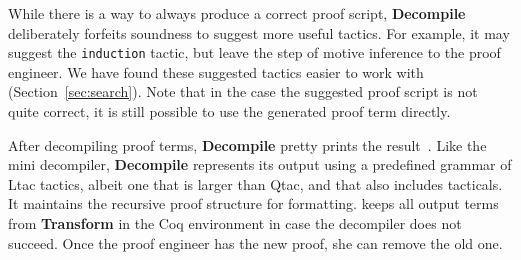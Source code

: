 While there is a way to always produce a correct proof script,
\textbf{Decompile} deliberately forfeits soundness to suggest more useful tactics.
For example, it may suggest the \lstinline{induction} tactic, but leave the step of motive inference to the proof engineer.
We have found these suggested tactics easier to work with (Section~\ref{sec:search}).
Note that in the case the suggested proof script is not quite correct,
it is still possible to use the generated proof term directly.

After decompiling proof terms, \textbf{Decompile} pretty prints the result~\href{https://github.com/uwplse/coq-plugin-lib/blob/9ef05815c261de9c99b604c6b581ba1c4fbc1a46/src/coq/decompiler/decompiler.ml}{}.
Like the mini decompiler, \textbf{Decompile} represents its output using a predefined grammar of Ltac tactics,
albeit one that is larger than Qtac, and that also includes tacticals.
It maintains the recursive proof structure for formatting. %
\toolname keeps all output terms from \textbf{Transform} in the Coq environment in case the decompiler does not succeed.
Once the proof engineer has the new proof, she can remove the old one.


